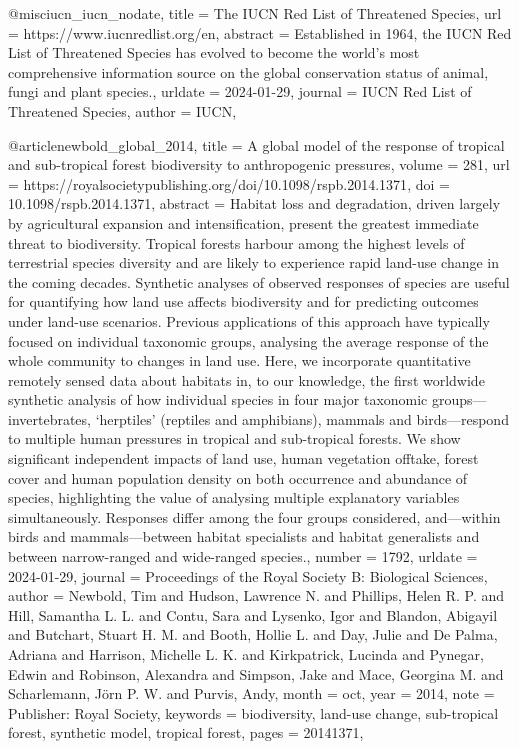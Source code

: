 {{{@misc{iucn_iucn_nodate,
	title = {The {IUCN} {Red} {List} of {Threatened} {Species}},
	url = {https://www.iucnredlist.org/en},
	abstract = {Established in 1964, the IUCN Red List of Threatened Species has evolved to become the world’s most comprehensive information source on the global conservation status of animal, fungi and plant species.},
	urldate = {2024-01-29},
	journal = {IUCN Red List of Threatened Species},
	author = {IUCN},
}

@article{newbold_global_2014,
	title = {A global model of the response of tropical and sub-tropical forest biodiversity to anthropogenic pressures},
	volume = {281},
	url = {https://royalsocietypublishing.org/doi/10.1098/rspb.2014.1371},
	doi = {10.1098/rspb.2014.1371},
	abstract = {Habitat loss and degradation, driven largely by agricultural expansion and intensification, present the greatest immediate threat to biodiversity. Tropical forests harbour among the highest levels of terrestrial species diversity and are likely to experience rapid land-use change in the coming decades. Synthetic analyses of observed responses of species are useful for quantifying how land use affects biodiversity and for predicting outcomes under land-use scenarios. Previous applications of this approach have typically focused on individual taxonomic groups, analysing the average response of the whole community to changes in land use. Here, we incorporate quantitative remotely sensed data about habitats in, to our knowledge, the first worldwide synthetic analysis of how individual species in four major taxonomic groups—invertebrates, ‘herptiles’ (reptiles and amphibians), mammals and birds—respond to multiple human pressures in tropical and sub-tropical forests. We show significant independent impacts of land use, human vegetation offtake, forest cover and human population density on both occurrence and abundance of species, highlighting the value of analysing multiple explanatory variables simultaneously. Responses differ among the four groups considered, and—within birds and mammals—between habitat specialists and habitat generalists and between narrow-ranged and wide-ranged species.},
	number = {1792},
	urldate = {2024-01-29},
	journal = {Proceedings of the Royal Society B: Biological Sciences},
	author = {Newbold, Tim and Hudson, Lawrence N. and Phillips, Helen R. P. and Hill, Samantha L. L. and Contu, Sara and Lysenko, Igor and Blandon, Abigayil and Butchart, Stuart H. M. and Booth, Hollie L. and Day, Julie and De Palma, Adriana and Harrison, Michelle L. K. and Kirkpatrick, Lucinda and Pynegar, Edwin and Robinson, Alexandra and Simpson, Jake and Mace, Georgina M. and Scharlemann, Jörn P. W. and Purvis, Andy},
	month = oct,
	year = {2014},
	note = {Publisher: Royal Society},
	keywords = {biodiversity, land-use change, sub-tropical forest, synthetic model, tropical forest},
	pages = {20141371},
}

}}}
